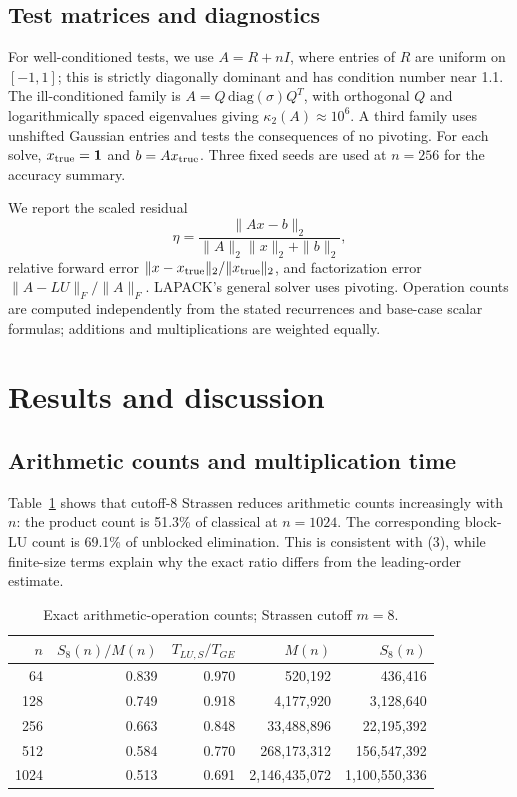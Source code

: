 \documentclass[9pt,a4paper]{article}
\begin{document}
\subsection{Test matrices and diagnostics}
For well-conditioned tests, we use $A=R+nI$, where entries of $R$ are uniform on $[-1,1]$; this is strictly diagonally dominant and has condition number near 1.1. The ill-conditioned family is $A=Q\,\mathrm{diag}(\sigma)Q^T$, with orthogonal $Q$ and logarithmically spaced eigenvalues giving $\kappa_2(A)\approx10^6$. A third family uses unshifted Gaussian entries and tests the consequences of no pivoting. For each solve, $x_{\rm true}=\mathbf{1}$ and $b=Ax_{\rm true}$. Three fixed seeds are used at $n=256$ for the accuracy summary.

We report the scaled residual
\[
\eta=\frac{\|Ax-b\|_2}{\|A\|_2\|x\|_2+\|b\|_2},
\]
relative forward error $\|x-x_{\rm true}\|_2/\|x_{\rm true}\|_2$, and factorization error $\|A-LU\|_F/\|A\|_F$. LAPACK's general solver uses pivoting. Operation counts are computed independently from the stated recurrences and base-case scalar formulas; additions and multiplications are weighted equally.

\section{Results and discussion}
\subsection{Arithmetic counts and multiplication time}
Table~\ref{tab:counts} shows that cutoff-8 Strassen reduces arithmetic counts increasingly with $n$: the product count is 51.3\% of classical at $n=1024$. The corresponding block-LU count is 69.1\% of unblocked elimination. This is consistent with (3), while finite-size terms explain why the exact ratio differs from the leading-order estimate.

\begin{table}[h]\centering\small
\caption{Exact arithmetic-operation counts; Strassen cutoff $m=8$.}\label{tab:counts}
\begin{tabular}{r r r r r}\toprule
$n$ & $S_8(n)/M(n)$ & $T_{LU,S}/T_{GE}$ & $M(n)$ & $S_8(n)$\\\midrule
64 & 0.839 & 0.970 & 520,192 & 436,416\\
128 & 0.749 & 0.918 & 4,177,920 & 3,128,640\\
256 & 0.663 & 0.848 & 33,488,896 & 22,195,392\\
512 & 0.584 & 0.770 & 268,173,312 & 156,547,392\\
1024 & 0.513 & 0.691 & 2,146,435,072 & 1,100,550,336\\\bottomrule
\end{tabular}
\end{table}
\end{document}
